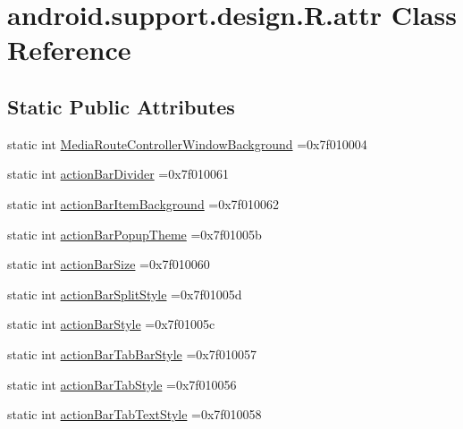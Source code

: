 \hypertarget{classandroid_1_1support_1_1design_1_1R_1_1attr}{}\section{android.\+support.\+design.\+R.\+attr Class Reference}
\label{classandroid_1_1support_1_1design_1_1R_1_1attr}
\subsection*{Static Public Attributes}
\begin{DoxyCompactItemize}
\item 
static int \hyperlink{classandroid_1_1support_1_1design_1_1R_1_1attr_a68258145838ffbb62f6d957439e41f55}{Media\+Route\+Controller\+Window\+Background} =0x7f010004
\item 
static int \hyperlink{classandroid_1_1support_1_1design_1_1R_1_1attr_a414b92e66e21228ba492f0816373c4fe}{action\+Bar\+Divider} =0x7f010061
\item 
static int \hyperlink{classandroid_1_1support_1_1design_1_1R_1_1attr_a39a183fd8748721aaa4fa22a492f13da}{action\+Bar\+Item\+Background} =0x7f010062
\item 
static int \hyperlink{classandroid_1_1support_1_1design_1_1R_1_1attr_a0f8b2d84f24c78d7da114bc3055a921a}{action\+Bar\+Popup\+Theme} =0x7f01005b
\item 
static int \hyperlink{classandroid_1_1support_1_1design_1_1R_1_1attr_ad892efeaa3b9e4b0892ccc04c1e42f6a}{action\+Bar\+Size} =0x7f010060
\item 
static int \hyperlink{classandroid_1_1support_1_1design_1_1R_1_1attr_ad4f51b6783eb5ada7fcecc7351c71b30}{action\+Bar\+Split\+Style} =0x7f01005d
\item 
static int \hyperlink{classandroid_1_1support_1_1design_1_1R_1_1attr_aa690dad5a754dbbe42fc87c513350c33}{action\+Bar\+Style} =0x7f01005c
\item 
static int \hyperlink{classandroid_1_1support_1_1design_1_1R_1_1attr_a6ffaafec7b48bf979a12acf37ddeac31}{action\+Bar\+Tab\+Bar\+Style} =0x7f010057
\item 
static int \hyperlink{classandroid_1_1support_1_1design_1_1R_1_1attr_acf3735cc1f6496c4924b89004afa2e4f}{action\+Bar\+Tab\+Style} =0x7f010056
\item 
static int \hyperlink{classandroid_1_1support_1_1design_1_1R_1_1attr_aa71a022be5ee164ec1d42d561579b45d}{action\+Bar\+Tab\+Text\+Style} =0x7f010058

\end{DoxyCompactItemize}

